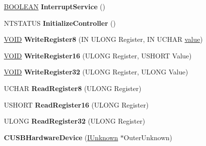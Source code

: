 \begin{DoxyCompactItemize}
\item 
\mbox{\label{class_c_u_s_b_hardware_device_a0b227440b992c7d9d47df621cc2da7a4}} 
\hyperlink{_processor_bind_8h_a112e3146cb38b6ee95e64d85842e380a}{B\+O\+O\+L\+E\+AN} {\bfseries Interrupt\+Service} ()
\item 
\mbox{\label{class_c_u_s_b_hardware_device_a6fa633eacb3d5281f2a5bafc2c24d887}} 
N\+T\+S\+T\+A\+T\+US {\bfseries Initialize\+Controller} ()
\item 
\mbox{\label{class_c_u_s_b_hardware_device_a1cddd7e5cc3898b3735db94011cd2a38}} 
\hyperlink{interfacevoid}{V\+O\+ID} {\bfseries Write\+Register8} (IN U\+L\+O\+NG Register, IN U\+C\+H\+AR \hyperlink{unionvalue}{value})
\item 
\mbox{\label{class_c_u_s_b_hardware_device_ab37b47a0f6409bd61fe22a5c5eb9df9f}} 
\hyperlink{interfacevoid}{V\+O\+ID} {\bfseries Write\+Register16} (U\+L\+O\+NG Register, U\+S\+H\+O\+RT Value)
\item 
\mbox{\label{class_c_u_s_b_hardware_device_a392d80ec792aed0d71a64dbd986bd07d}} 
\hyperlink{interfacevoid}{V\+O\+ID} {\bfseries Write\+Register32} (U\+L\+O\+NG Register, U\+L\+O\+NG Value)
\item 
\mbox{\label{class_c_u_s_b_hardware_device_a416c997b283bc57ffa0bb73d0af8da04}} 
U\+C\+H\+AR {\bfseries Read\+Register8} (U\+L\+O\+NG Register)
\item 
\mbox{\label{class_c_u_s_b_hardware_device_a895c556bd7990ea65bec4bacd094b4ce}} 
U\+S\+H\+O\+RT {\bfseries Read\+Register16} (U\+L\+O\+NG Register)
\item 
\mbox{\label{class_c_u_s_b_hardware_device_a21fcc5c611acdcd73dea09a5244654a6}} 
U\+L\+O\+NG {\bfseries Read\+Register32} (U\+L\+O\+NG Register)
\item 
\mbox{\label{class_c_u_s_b_hardware_device_aa2b87081242b129aa1b4cfab189e0265}} 
{\bfseries C\+U\+S\+B\+Hardware\+Device} (\hyperlink{interface_i_unknown}{I\+Unknown} $\ast$Outer\+Unknown)
\end{DoxyCompactItemize}
